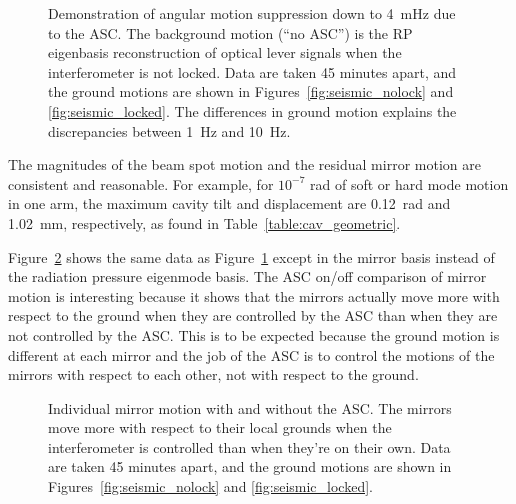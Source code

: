 \begin{figure}
\begin{centering}
\caption[Angular motion suppression due to the ASC]{Demonstration of
  angular motion suppression down to 4~mHz due to the ASC. 
The background motion (``no ASC'') is the RP eigenbasis reconstruction of optical lever signals
  when the interferometer is not locked. Data are taken 45 minutes
  apart, and the ground motions are shown in
  Figures~\ref{fig:seismic_nolock} and \ref{fig:seismic_locked}. The
  differences in ground motion explains the discrepancies between 1~Hz
  and 10~Hz.}
\label{fig:ASConoff}
\end{centering}
\end{figure}

The magnitudes of the beam spot motion and the residual mirror motion
are consistent and reasonable. For example, for $10^{-7}$ rad of soft
or hard mode motion in one arm, the maximum cavity tilt and
displacement are 0.12~\micro rad and 1.02~mm, respectively, as found
in Table~\ref{table:cav_geometric}.

Figure~\ref{fig:mirror_onoff} shows the same data as
Figure~\ref{fig:ASConoff} except in the mirror basis instead of the
radiation pressure eigenmode basis. The ASC on/off comparison of
mirror motion is interesting because it shows that the mirrors
actually move more with respect to the ground when they are controlled
by the ASC than when they are not controlled by the ASC. This is to be
expected because the ground motion is different at each mirror and the
job of the ASC is to control the motions of the mirrors with respect
to each other, not with respect to the ground.

\begin{figure}
\begin{centering}
\caption[Individual mirror motion with and without ASC]{Individual
  mirror motion with and without the ASC. The mirrors move more with
  respect to their local grounds when the interferometer is controlled
  than when they're on their own. Data are taken 45 minutes apart, and the ground
  motions are shown in Figures~\ref{fig:seismic_nolock} and
  \ref{fig:seismic_locked}.}
\label{fig:mirror_onoff}
\end{centering}
\end{figure}



